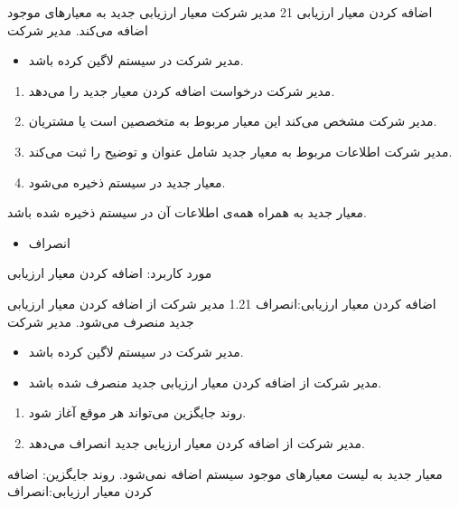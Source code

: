 \usecase
{
	 اضافه کردن معیار ارزیابی
}
{21}
{
مدیر شرکت معیار ارزیابی جدید به معیارهای موجود اضافه می‌کند.
}
{
مدیر شرکت
}
{
}
{
	\begin{itemize}
	\vspace*{-0.6cm}
	\item 
	مدیر شرکت در سیستم لاگین کرده باشد.
\end{itemize}	
}
{
	\vspace*{-0.6cm}
\begin{enumerate}
	\item
	مدیر شرکت درخواست اضافه کردن معیار جدید را می‌دهد.
	\item
	مدیر شرکت مشخص می‌کند این معیار مربوط به متخصصین است یا مشتریان.
	\item
		مدیر شرکت اطلاعات مربوط به معیار جدید شامل عنوان و توضیح را ثبت می‌کند.
		\item
		معیار جدید در سیستم ذخیره می‌شود.
\end{enumerate}
}
{
معیار جدید به همراه همه‌ی اطلاعات آن در سیستم ذخیره شده باشد.
}
{
	\begin{itemize}
		\vspace*{-0.6cm}
		\item 
		انصراف
	\end{itemize}
}
{
	مورد کاربرد: اضافه کردن معیار ارزیابی
}




\alternativeflow
{
 اضافه کردن معیار ارزیابی:انصراف
}
{1.21}
{
	مدیر شرکت از اضافه کردن معیار ارزیابی جدید منصرف می‌شود.
}
{
	مدیر شرکت
}
{}
{
	\begin{itemize}
		\vspace*{-0.6cm}
		\item 
		مدیر شرکت در سیستم لاگین کرده باشد.
		\item
		مدیر شرکت از اضافه کردن معیار ارزیابی جدید منصرف شده باشد.
	\end{itemize}
}
{
	\vspace*{-0.6cm}
	\begin{enumerate}
		\item 
		روند جایگزین می‌تواند هر موقع آغاز شود.
		\item
		مدیر شرکت از اضافه کردن معیار ارزیابی جدید انصراف می‌دهد.
	\end{enumerate}
}
{
معیار جدید به لیست معیارهای موجود سیستم اضافه نمی‌شود.
}
{
	روند جایگزین:  اضافه کردن معیار ارزیابی:انصراف
}


